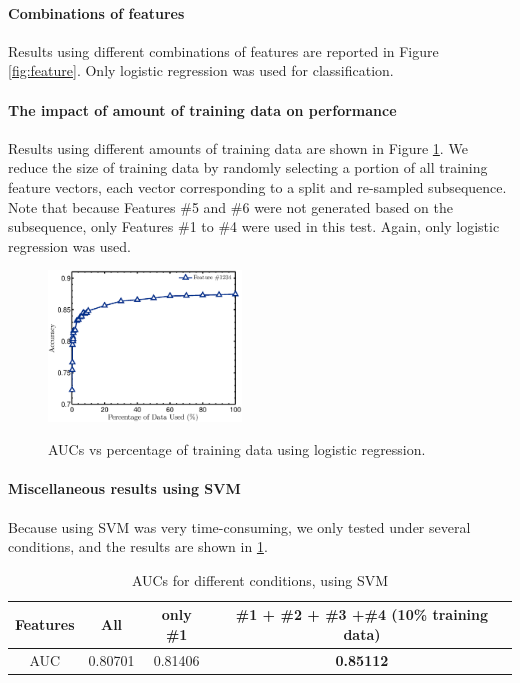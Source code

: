 \documentclass{article} %
\begin{document}
\paragraph{Combinations of features} %
\label{ssub:combinations_of_features}
Results using different combinations of features are reported in Figure \ref{fig:feature}. Only logistic regression was used for classification.



\paragraph{The impact of amount of training data on performance} %
\label{ssub:the_impact_of_amount_of_training_data_on_performance}
Results using different amounts of training data are shown in Figure \ref{fig:percentage}. We reduce the size of training data by randomly selecting a portion of all training feature vectors, each vector corresponding to a split and re-sampled subsequence. Note that because Features \#5 and \#6 were not generated based on the subsequence, only Features \#1 to \#4 were used in this test. Again, only logistic regression was used.

\begin{figure}
    \centering
    \includegraphics[height=40mm]{fig/percentage.eps}\\
    \caption{AUCs vs percentage of training data using logistic regression.}
    \label{fig:percentage}
 \end{figure}

\paragraph{Miscellaneous results using SVM}  %
\label{subs:miscellaneous}
Because using SVM was very time-consuming, we only tested under several conditions, and the results are shown in \ref{tbl:test_result_SVM}.

\begin{table}[!ht]
\caption{AUCs for different conditions, using SVM}
\label{tbl:test_result_SVM}
    \begin{center}
        \begin{tabular}{ c | c  c  c  }
            \hline
             Features & All & only \#1 & \#1 + \#2 + \#3 +\#4 (10\% training data) \\
             \hline
             AUC & 0.80701 & 0.81406 & \textbf{0.85112} \\
             \hline
        \end{tabular}
    \end{center}
\end{table}
\end{document}
